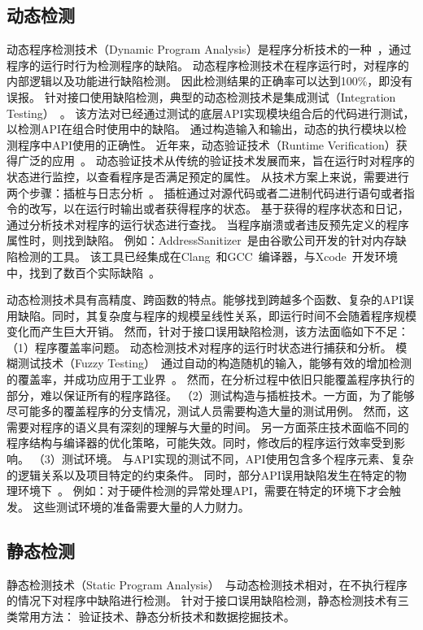 \subsection{动态检测}
动态程序检测技术（Dynamic Program Analysis）是程序分析技术的一种~\cite{15-pa}，通过程序的运行时行为检测程序的缺陷。
动态程序检测技术在程序运行时，对程序的内部逻辑以及功能进行缺陷检测。
因此检测结果的正确率可以达到100\%，即没有误报。
针对接口使用缺陷检测，典型的动态检测技术是集成测试（Integration Testing）~\cite{02-icis-integration-testing}。
该方法对已经通过测试的底层API实现模块组合后的代码进行测试，以检测API在组合时使用中的缺陷。
通过构造输入和输出，动态的执行模块以检测程序中API使用的正确性。
近年来，动态验证技术（Runtime Verification）获得广泛的应用~\cite{18-rv}。
动态验证技术从传统的验证技术发展而来，旨在运行时对程序的状态进行监控，以查看程序是否满足预定的属性。
从技术方案上来说，需要进行两个步骤：插桩与日志分析~\cite{07-acm-valgrind, 91-purify, 12-atc-AddressSanitizer}。
插桩通过对源代码或者二进制代码进行语句或者指令的改写，以在运行时输出或者获得程序的状态。
基于获得的程序状态和日记，通过分析技术对程序的运行状态进行查找。
当程序崩溃或者违反预先定义的程序属性时，则找到缺陷。
例如：AddressSanitizer~\cite{12-atc-AddressSanitizer}是由谷歌公司开发的针对内存缺陷检测的工具。
该工具已经集成在Clang~\cite{clang}和GCC~\cite{gcc}编译器，与Xcode~\cite{Xcode}开发环境中，找到了数百个实际缺陷~\cite{AddressSanitizerFoundBugs}。


动态检测技术具有高精度、跨函数的特点。能够找到跨越多个函数、复杂的API误用缺陷。同时，其复杂度与程序的规模呈线性关系，即运行时间不会随着程序规模变化而产生巨大开销。
然而，针对于接口误用缺陷检测，该方法面临如下不足：
（1）程序覆盖率问题。
动态检测技术对程序的运行时状态进行捕获和分析。
模糊测试技术（Fuzzy Testing）~\cite{18-fuzz}通过自动的构造随机的输入，能够有效的增加检测的覆盖率，并成功应用于工业界~\cite{18-saner-fuzz}。
然而，在分析过程中依旧只能覆盖程序执行的部分，难以保证所有的程序路径。
（2）测试构造与插桩技术。一方面，为了能够尽可能多的覆盖程序的分支情况，测试人员需要构造大量的测试用例。
然而，这需要对程序的语义具有深刻的理解与大量的时间。
另一方面茶庄技术面临不同的程序结构与编译器的优化策略，可能失效。同时，修改后的程序运行效率受到影响。
（3）测试环境。
与API实现的测试不同，API使用包含多个程序元素、复杂的逻辑关系以及项目特定的约束条件。
同时，部分API误用缺陷发生在特定的物理环境下~\cite{15-kernel-sv}。
例如：对于硬件检测的异常处理API，需要在特定的环境下才会触发。
这些测试环境的准备需要大量的人力财力。

\subsection{静态检测}
静态检测技术（Static Program Analysis）~\cite{08-ieee-static}与动态检测技术相对，在不执行程序的情况下对程序中缺陷进行检测。
针对于接口误用缺陷检测，静态检测技术有三类常用方法：
验证技术、静态分析技术和数据挖掘技术。

